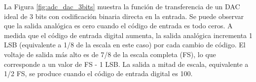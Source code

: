     \begin{table}[h!]
      \caption{Códigos binarios unipolares, convertidor de 4 bits.}
      \begin{center}
      \label{tab:adc_codigos_unipolares}
      \end{center}
    \end{table}

    La Figura \ref{fig:adc_dac_3bits} muestra la función de transferencia de un DAC ideal de 3 bits con codificación binaria directa en la entrada. Se puede observar que la salida analógica es cero cuando el código de entrada es todo ceros. A medida que el código de entrada digital aumenta, la salida analógica incrementa 1 LSB (equivalente a 1/8 de la escala en este caso) por cada cambio de código. El voltaje de salida más alto es de 7/8 de la escala completa (FS), lo que corresponde a un valor de FS - 1 LSB. La salida a mitad de escala, equivalente a 1/2 FS, se produce cuando el código de entrada digital es 100.

